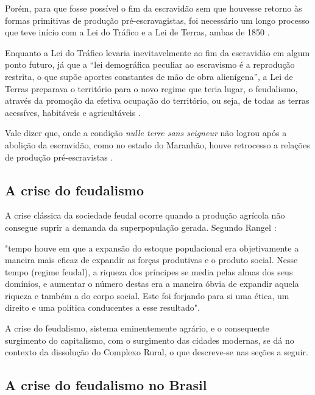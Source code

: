 \documentclass[
	12pt,				%
	oneside,			%
	a4paper,			%
	chapter=TITLE,		%
	section=TITLE,		%
	english,			%
	brazil				%
	]{abntex2}
\begin{document}
Porém, para que fosse possível o fim da escravidão sem que houvesse
retorno às formas primitivas de produção pré-escravagistas, foi
necessário um longo processo que teve início com a Lei do Tráfico e a
Lei de Terras, ambas de 1850 \autocite[732]{rangel1989}.

Enquanto a Lei do Tráfico levaria inevitavelmente ao fim da escravidão
em algum ponto futuro, já que a ``lei demográfica peculiar ao escravismo
é a reprodução restrita, o que supõe aportes constantes de mão de obra
alienígena'', a Lei de Terras preparava o território para o novo regime
que teria lugar, o feudalismo, através da promoção da efetiva ocupação
do território, ou seja, de todas as terras acessíves, habitáveis e
agricultáveis \autocite[732-733]{rangel1989}.

Vale dizer que, onde a condição \emph{nulle terre sans seigneur} não
logrou após a abolição da escravidão, como no estado do Maranhão, houve
retrocesso a relações de produção pré-escravistas
\autocite[733-734]{rangel1989}.

\subsection{A crise do feudalismo}\label{a-crise-do-feudalismo}

A crise clássica da sociedade feudal ocorre quando a produção agrícola
não consegue suprir a demanda da superpopulação gerada. Segundo Rangel
\autocite*[219]{rangel1961}:
\begin{citacao} 
"tempo houve em que a expansão do estoque populacional era objetivamente a
maneira mais eficaz de expandir as forças produtivas e o produto social. Nesse
tempo (regime feudal), a riqueza dos príncipes se media pelas almas dos seus
domínios, e aumentar o número destas era a maneira óbvia de expandir aquela
riqueza e também a do corpo social. Este foi forjando para si uma ética, um
direito e uma política conducentes a esse resultado".
\end{citacao}
A crise do feudalismo, sistema eminentemente agrário, e o consequente
surgimento do capitalismo, com o surgimento das cidades modernas, se dá
no contexto da dissolução do Complexo Rural, o que descreve-se nas
seções a seguir.

\subsection{A crise do feudalismo no
Brasil}\label{a-crise-do-feudalismo-no-brasil}
\end{document}
